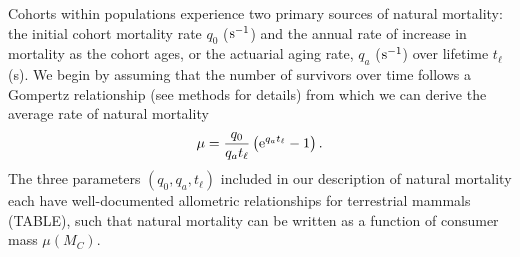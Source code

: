 \documentclass[11pt]{article}
\begin{document}

Cohorts within populations experience two primary sources of natural mortality: the initial cohort mortality rate $q_0$ (${\rm s}^{-1}$) and the annual rate of increase in mortality as the cohort ages, or the actuarial aging rate, $q_a$ (${\rm s}^{-1}$) over lifetime $t_\ell$ (s).
We begin by assuming that the number of survivors over time follows a Gompertz relationship (see methods for details) from which we can derive the average rate of natural mortality \citep{CalderIII:1983jd,yeakel2018dynamics}
\begin{equation}
    \mu = \frac{q_0}{q_a t_\ell}\left({\rm e}^{q_a t_\ell}-1\right).
\end{equation}
The three parameters $(q_0,q_a,t_\ell)$ included in our description of natural mortality each have well-documented allometric relationships for terrestrial mammals (TABLE), such that natural mortality can be written as a function of consumer mass $\mu(M_C)$.
\end{document}
